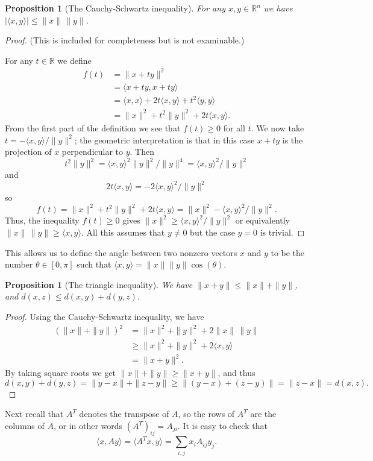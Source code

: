\documentclass{amsart}
\newcommand{\R}         {{\mathbb{R}}}
\newcommand{\ip}[1]     {\langle #1\rangle}
\renewcommand{\:}{\colon}
\newtheorem{proposition}[theorem]{Proposition}
\theoremstyle{definition}
\begin{document}
\begin{proposition}[The Cauchy-Schwartz inequality]
 For any $x,y\in\R^n$ we have $|\ip{x,y}|\leq\|x\|\,\|y\|$.
\end{proposition}
\begin{proof}
 (This is included for completeness but is not examinable.)

 For any $t\in\R$ we define
 \begin{align*}
   f(t) &= \|x+ty\|^2 \\
        &= \ip{x+ty,x+ty} \\
        &= \ip{x,x} + 2t\ip{x,y} + t^2\ip{y,y} \\
        &= \|x\|^2 + t^2\|y\|^2 + 2t\ip{x,y}.
 \end{align*}
 From the first part of the definition we see that $f(t)\geq 0$ for
 all $t$.  We now take $t=-\ip{x,y}/\|y\|^2$; the geometric
 interpretation is that in this case $x+ty$ is the projection of $x$
 perpendicular to $y$.  Then
 \[ t^2\|y\|^2=\ip{x,y}^2\|y\|^2/\|y\|^4=
    \ip{x,y}^2/\|y\|^2
 \]
 and
 \[ 2t\ip{x,y} = -2\ip{x,y}^2/\|y\|^2 \]
 so
 \[ f(t) = \|x\|^2 + t^2\|y\|^2 + 2t\ip{x,y} =
           \|x\|^2 - \ip{x,y}^2/\|y\|^2.
 \]
 Thus, the inequality $f(t)\geq 0$ gives
 $\|x\|^2\geq\ip{x,y}^2/\|y\|^2$ or equivalently
 $\|x\|\,\|y\|\geq\ip{x,y}$.  All this assumes that $y\neq 0$ but the
 case $y=0$ is trivial.
\end{proof}
This allows us to define the angle between two nonzero vectors $x$ and
$y$ to be the number $\theta\in[0,\pi]$ such that
$\ip{x,y}=\|x\|\|y\|\cos(\theta)$.

\begin{proposition}[The triangle inequality]
 We have $\|x+y\|\leq \|x\|+\|y\|$, and
 $d(x,z)\leq d(x,y)+d(y,z)$.
\end{proposition}
\begin{proof}
 Using the Cauchy-Schwartz inequality, we have
 \begin{align*}
  (\|x\|+\|y\|)^2 &= \|x\|^2 + \|y\|^2 + 2 \|x\|\,\|y\| \\
     &\geq \|x\|^2 + \|y\|^2 + 2 \ip{x,y} \\
     &= \|x+y\|^2.
 \end{align*}
 By taking square roots we get $\|x\|+\|y\|\geq\|x+y\|$, and thus
 \[ d(x,y) + d(y,z) = \|y-x\| + \|z-y\|
   \geq \|(y-x)+(z-y)\| = \|z-x\| = d(x,z).
 \]
\end{proof}

Next recall that $A^T$ denotes the transpose of $A$, so the rows of
$A^T$ are the columns of $A$, or in other words $(A^T)_{ij}=A_{ji}$.
It is easy to check that
\[ \ip{x,Ay} = \ip{A^Tx,y} = \sum_{i,j} x_i A_{ij} y_j. \]
\end{document}
